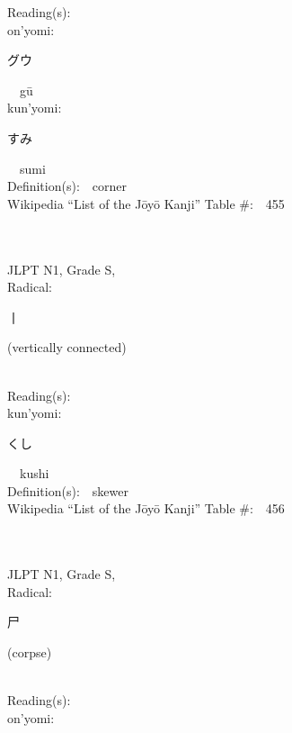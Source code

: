 \begin{multicols}{2}
Reading(s):\ \ \\
{\hspace*{1em}}on'yomi:\ \ \\
{\hspace*{2em}}{\begin{CJK}{UTF8}{min} グウ \end{CJK}}\ \ g\=u\ \ \\
{\hspace*{1em}}kun'yomi:\ \ \\
{\hspace*{2em}}{\begin{CJK}{UTF8}{min} すみ \end{CJK}}\ \ sumi\ \ \\
Definition(s):\ \ corner \\
Wikipedia ``List of the J\=oy\=o Kanji'' Table \#:\ \ 455 \\
\ \ \\
{\fontsize{34pt}{40pt}  }\ \ \\
{JLPT N1, Grade S, \\Radical:\ \ {\begin{CJK}{UTF8}{min} 丨 \end{CJK}} (vertically connected) } \\
Reading(s):\ \ \\
{\hspace*{1em}}kun'yomi:\ \ \\
{\hspace*{2em}}{\begin{CJK}{UTF8}{min} くし \end{CJK}}\ \ kushi\ \ \\
Definition(s):\ \ skewer \\
Wikipedia ``List of the J\=oy\=o Kanji'' Table \#:\ \ 456 \\
\ \ \\
{\fontsize{34pt}{40pt}  }\ \ \\
{JLPT N1, Grade S, \\Radical:\ \ {\begin{CJK}{UTF8}{min} 尸 \end{CJK}} (corpse) } \\
Reading(s):\ \ \\
{\hspace*{1em}}on'yomi:\ \ \\

\end{multicols}
